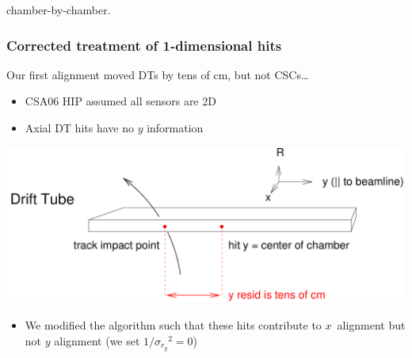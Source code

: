 \documentclass[compress]{beamer}
\begin{document}
\begin{frame}
{\begin{minipage}{\linewidth}
\vspace{0.15 cm}
      chamber-by-chamber.

  \end{minipage}}

\end{frame}

\begin{frame}
  \frametitle{Corrected treatment of 1-dimensional hits}

  Our first alignment moved DTs by tens of cm, but not CSCs\ldots
  \begin{itemize}
    \item CSA06 HIP assumed all sensors are 2D
    \item Axial DT hits have no $y$ information
  \end{itemize}

  \vspace{-0.5 cm}
  \begin{center}
    \includegraphics[width=0.9\linewidth]{onedimhit}
  \end{center}

  \vspace{-0.25 cm}
  \begin{itemize}
    \item We modified the algorithm such that these hits contribute to
    \mbox{$x$ alignment} but not $y$ alignment (we set $1/{\sigma_{r_y}}^2 = 0$)
  \end{itemize}
\end{frame}
\end{document}
